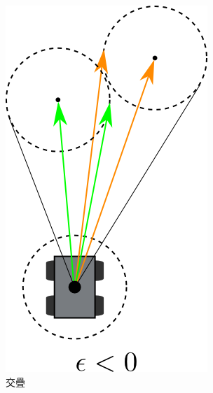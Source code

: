 \begin{figure}[h!]
	\centering
	\begin{subfigure}[t]{0.25\textwidth}
		\includegraphics[width=\textwidth]{figures/algorithm/epsilon_situation_1}
		\caption{交疊}
		\label{f:epsilon_1}
	\end{subfigure}
	\begin{subfigure}[t]{0.3\textwidth}

\end{subfigure}
\end{figure}
